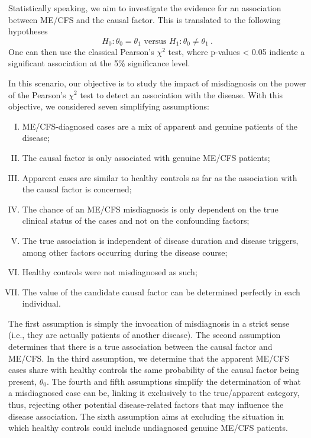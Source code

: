 Statistically speaking, we aim to investigate the evidence for an association between ME/CFS and the causal factor. This is translated to the following hypotheses
% 
\[H_0: \theta_0= \theta_1 \mbox{ versus } H_1: \theta_0 \ne \theta_1\ .\]
% 
One can then use the classical Pearson's $\chi^2$ test, where p-values < 0.05 indicate a significant association at the 5\% significance level.

In this scenario, our objective is to study the impact of misdiagnosis on the power of the Pearson's $\chi^2$ test to detect an association with the disease. With this objective, we considered seven simplifying assumptions:
% 
\begin{enumerate}[I.\ ]
    \setlength{\itemsep}{1.5pt}
    \setlength{\parskip}{0pt}
    \setlength{\parsep}{0pt}
    \item ME/CFS-diagnosed cases are a mix of apparent and genuine patients of the disease;
    \item The causal factor is only associated with genuine ME/CFS patients;
    \item Apparent cases are similar to healthy controls as far as the association with the causal factor is concerned;
    \item The chance of an ME/CFS misdiagnosis is only dependent on the true clinical status of the cases and not on the confounding factors;
    \item The true association is independent of disease duration and disease triggers, among other factors occurring during the disease course;
    \item Healthy controls were not misdiagnosed as such;
    \item The value of the candidate causal factor can be determined perfectly in each individual.
\end{enumerate}

The first assumption is simply the invocation of misdiagnosis in a strict sense (i.e., they are actually patients of another disease). The second assumption determines that there is a true association between the causal factor and ME/CFS. In the third assumption, we determine that the apparent ME/CFS cases share with healthy controls the same probability of the causal factor being present, $\theta_0$. The fourth and fifth assumptions simplify the determination of what a misdiagnosed case can be, linking it exclusively to the true/apparent category, thus, rejecting other potential disease-related factors that may influence the disease association. The sixth assumption aims at excluding the situation in which healthy controls could include undiagnosed genuine ME/CFS patients.

